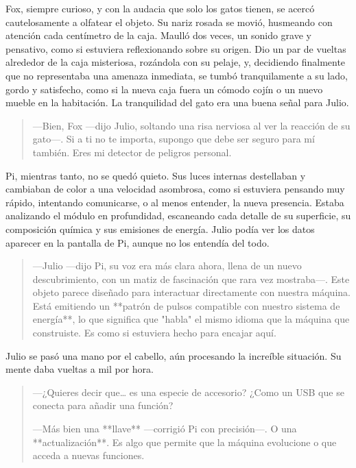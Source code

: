 \documentclass[a4paper,12pt]{book}
\begin{document}
Fox, siempre curioso, y con la audacia que solo los gatos tienen, se acercó cautelosamente a olfatear el objeto. Su nariz rosada se movió, husmeando con atención cada centímetro de la caja. Maulló dos veces, un sonido grave y pensativo, como si estuviera reflexionando sobre su origen. Dio un par de vueltas alrededor de la caja misteriosa, rozándola con su pelaje, y, decidiendo finalmente que no representaba una amenaza inmediata, se tumbó tranquilamente a su lado, gordo y satisfecho, como si la nueva caja fuera un cómodo cojín o un nuevo mueble en la habitación. La tranquilidad del gato era una buena señal para Julio.

\begin{quote}
    —Bien, Fox —dijo Julio, soltando una risa nerviosa al ver la reacción de su gato—. Si a ti no te importa, supongo que debe ser seguro para mí también. Eres mi detector de peligros personal.
\end{quote}

Pi, mientras tanto, no se quedó quieto. Sus luces internas destellaban y cambiaban de color a una velocidad asombrosa, como si estuviera pensando muy rápido, intentando comunicarse, o al menos entender, la nueva presencia. Estaba analizando el módulo en profundidad, escaneando cada detalle de su superficie, su composición química y sus emisiones de energía. Julio podía ver los datos aparecer en la pantalla de Pi, aunque no los entendía del todo.

\begin{quote}
    —Julio —dijo Pi, su voz era más clara ahora, llena de un nuevo descubrimiento, con un matiz de fascinación que rara vez mostraba—. Este objeto parece diseñado para interactuar directamente con nuestra máquina. Está emitiendo un **patrón de pulsos compatible con nuestro sistema de energía**, lo que significa que "habla" el mismo idioma que la máquina que construiste. Es como si estuviera hecho para encajar aquí.
\end{quote}

Julio se pasó una mano por el cabello, aún procesando la increíble situación. Su mente daba vueltas a mil por hora.

\begin{quote}
    —¿Quieres decir que… es una especie de accesorio? ¿Como un USB que se conecta para añadir una función?

    —Más bien una **llave** —corrigió Pi con precisión—. O una **actualización**. Es algo que permite que la máquina evolucione o que acceda a nuevas funciones.
\end{quote}
\end{document}
